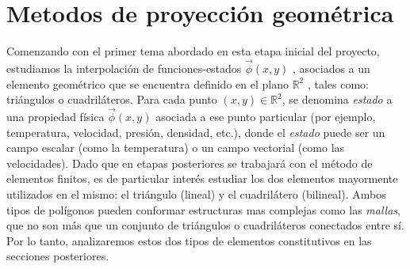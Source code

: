 \documentclass[../informe.tex]{subfiles}
\begin{document}
\section{Metodos de proyección geométrica}
\label{sec:met_geo}
Comenzando con el primer tema abordado en esta etapa inicial del proyecto, estudiamos la interpolación de funciones-estados $\vec{ \phi } (x,y)$ , asociados a un elemento geométrico que se encuentra definido en el plano $\mathbb{R}^2$ , tales como: triángulos o cuadriláteros. Para cada punto $(x,y)\in \mathbb{R}^2$, se denomina \emph{estado} a una propiedad física $\vec{ \phi } (x,y)$ asociada a ese punto particular (por ejemplo, temperatura, velocidad, presión, densidad, etc.), donde el \emph{estado} puede ser un campo escalar (como la temperatura) o un campo vectorial (como las velocidades). Dado que en etapas posteriores se trabajará con el método de elementos finitos, es de particular interés estudiar los dos elementos mayormente utilizados en el mismo: el triángulo (lineal) y el cuadrilátero (bilineal). Ambos tipos de polígonos pueden conformar estructuras mas complejas como las \emph{mallas}, que no son más que un conjunto de triángulos o cuadriláteros conectados entre sí. Por lo tanto, analizaremos estos dos tipos de elementos constitutivos en las secciones posteriores.
\end{document}
